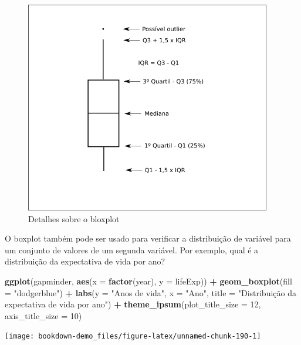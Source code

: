 \documentclass[]{book}
\newenvironment{Shaded}{\begin{snugshade}}{\end{snugshade}}
\newcommand{\KeywordTok}[1]{\textcolor[rgb]{0.13,0.29,0.53}{\textbf{#1}}}
\newcommand{\DataTypeTok}[1]{\textcolor[rgb]{0.13,0.29,0.53}{#1}}
\newcommand{\DecValTok}[1]{\textcolor[rgb]{0.00,0.00,0.81}{#1}}
\newcommand{\StringTok}[1]{\textcolor[rgb]{0.31,0.60,0.02}{#1}}
\newcommand{\OperatorTok}[1]{\textcolor[rgb]{0.81,0.36,0.00}{\textbf{#1}}}
\newcommand{\NormalTok}[1]{#1}
\begin{document}
\begin{figure}
\centering
\includegraphics{images/boxplot.png}
\caption{Detalhes sobre o bloxplot}
\end{figure}

O boxplot também pode ser usado para verificar a distribuição de
variável para um conjunto de valores de um segunda variável. Por
exemplo, qual é a distribuição da expectativa de vida por ano?

\begin{Shaded}
\begin{Highlighting}[]
\KeywordTok{ggplot}\NormalTok{(gapminder, }\KeywordTok{aes}\NormalTok{(}\DataTypeTok{x =} \KeywordTok{factor}\NormalTok{(year), }\DataTypeTok{y =}\NormalTok{ lifeExp)) }\OperatorTok{+}
\StringTok{  }\KeywordTok{geom_boxplot}\NormalTok{(}\DataTypeTok{fill =} \StringTok{"dodgerblue"}\NormalTok{) }\OperatorTok{+}
\StringTok{  }\KeywordTok{labs}\NormalTok{(}\DataTypeTok{y =} \StringTok{"Anos de vida"}\NormalTok{,}
       \DataTypeTok{x =} \StringTok{"Ano"}\NormalTok{,}
       \DataTypeTok{title =} \StringTok{"Distribuição da expectativa de vida por ano"}\NormalTok{) }\OperatorTok{+}
\StringTok{  }\KeywordTok{theme_ipsum}\NormalTok{(}\DataTypeTok{plot_title_size =} \DecValTok{12}\NormalTok{,   }
              \DataTypeTok{axis_title_size =} \DecValTok{10}\NormalTok{) }
\end{Highlighting}
\end{Shaded}

\begin{center}\texttt{[image: bookdown-demo\_files/figure-latex/unnamed-chunk-190-1]} \end{center}
\end{document}

